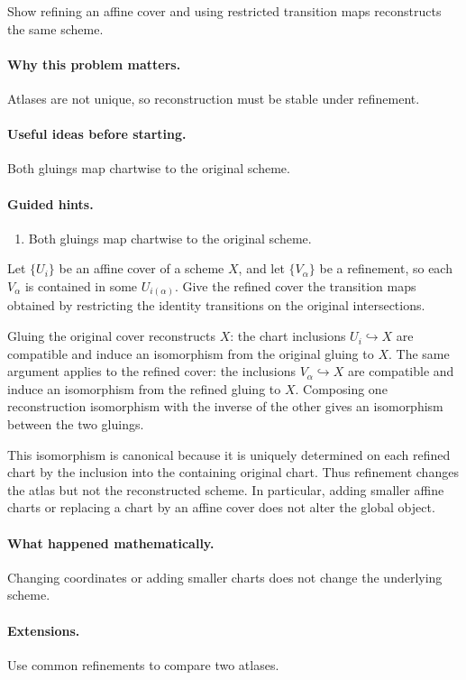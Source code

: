 \begin{problem}\label{prob:vi20-p11}
Show refining an affine cover and using restricted transition maps reconstructs the same scheme.
\end{problem}

\ifdefined\FullProblemDossiers
\paragraph{Why this problem matters.}
Atlases are not unique, so reconstruction must be stable under refinement.

\paragraph{Useful ideas before starting.}
Both gluings map chartwise to the original scheme.

\paragraph{Guided hints.}
\begin{enumerate}
\item Both gluings map chartwise to the original scheme.
\end{enumerate}

\begin{solution}
Let $\{U_i\}$ be an affine cover of a scheme $X$, and let $\{V_\alpha\}$ be a refinement, so each $V_\alpha$ is contained in some $U_{i(\alpha)}$.  Give the refined cover the transition maps obtained by restricting the identity transitions on the original intersections.

Gluing the original cover reconstructs $X$: the chart inclusions $U_i\hookrightarrow X$ are compatible and induce an isomorphism from the original gluing to $X$.  The same argument applies to the refined cover: the inclusions $V_\alpha\hookrightarrow X$ are compatible and induce an isomorphism from the refined gluing to $X$.  Composing one reconstruction isomorphism with the inverse of the other gives an isomorphism between the two gluings.

This isomorphism is canonical because it is uniquely determined on each refined chart by the inclusion into the containing original chart.  Thus refinement changes the atlas but not the reconstructed scheme.  In particular, adding smaller affine charts or replacing a chart by an affine cover does not alter the global object.
\end{solution}


\paragraph{What happened mathematically.}
Changing coordinates or adding smaller charts does not change the underlying scheme.

\paragraph{Extensions.}
Use common refinements to compare two atlases.
\fi
